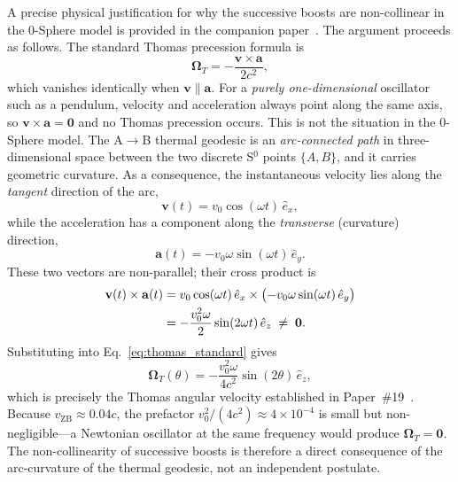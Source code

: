 \documentclass[%
 reprint, amsmath,amssymb, aps, prb, ]{revtex4-2}
\numberwithin{equation}{section}
\newcommand{\iphase}{\theta}
\begin{document}
A precise physical justification for why the successive boosts are non-collinear in the 0-Sphere model is provided in the companion paper~\cite{hanamura49}. The argument proceeds as follows. The standard Thomas precession formula is
\begin{equation}
\boldsymbol{\Omega}_T = -\frac{\mathbf{v} \times \mathbf{a}}{2c^2},
\label{eq:thomas_standard}
\end{equation}
which vanishes identically when $\mathbf{v} \parallel \mathbf{a}$. For a \emph{purely one-dimensional} oscillator such as a pendulum, velocity and acceleration always point along the same axis, so $\mathbf{v} \times \mathbf{a} = \mathbf{0}$ and no Thomas precession occurs. This is not the situation in the 0-Sphere model. The A$\to$B thermal geodesic is an \emph{arc-connected path} in three-dimensional space between the two discrete S$^0$ points $\{A,B\}$, and it carries geometric curvature. As a consequence, the instantaneous velocity lies along the \emph{tangent} direction of the arc,
\begin{equation}
\mathbf{v}(t) = v_0\cos(\omega t)\,\hat{e}_x,
\label{eq:v_geodesic}
\end{equation}
while the acceleration has a component along the \emph{transverse} (curvature) direction,
\begin{equation}
\mathbf{a}(t) = -v_0\omega\sin(\omega t)\,\hat{e}_y.
\label{eq:a_geodesic}
\end{equation}
These two vectors are non-parallel; their cross product is
\begin{align}
\mathbf{v}(t) \times \mathbf{a}(t)
&= v_0\cos(\omega t)\,\hat{e}_x \times \bigl(-v_0\omega\sin(\omega t)\,\hat{e}_y\bigr) \notag \\
&= -\frac{v_0^2\omega}{2}\sin(2\omega t)\,\hat{e}_z \;\neq\; \mathbf{0}.
\label{eq:cross_product}
\end{align}
Substituting into Eq.~\eqref{eq:thomas_standard} gives
\begin{equation}
\boldsymbol{\Omega}_T(\iphase) = -\frac{v_0^2\omega}{4c^2}\sin(2\iphase)\,\hat{e}_z,
\label{eq:OmT_derived}
\end{equation}
which is precisely the Thomas angular velocity established in Paper~\#19~\cite{hanamura19}. Because $v_{\text{ZB}} \approx 0.04c$, the prefactor $v_0^2/(4c^2) \approx 4\times 10^{-4}$ is small but non-negligible---a Newtonian oscillator at the same frequency would produce $\boldsymbol{\Omega}_T = \mathbf{0}$. The non-collinearity of successive boosts is therefore a direct consequence of the arc-curvature of the thermal geodesic, not an independent postulate.
\end{document}
